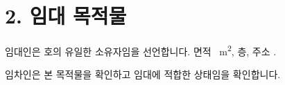 \section*{2. 임대 목적물}
임대인은 \Propunitnumber 호의 유일한 소유자임을 선언합니다. 면적 \Propaream~m\textsuperscript{2}, \Propfloor 층, 주소 \Propaddress.

임차인은 본 목적물을 확인하고 임대에 적합한 상태임을 확인합니다.
